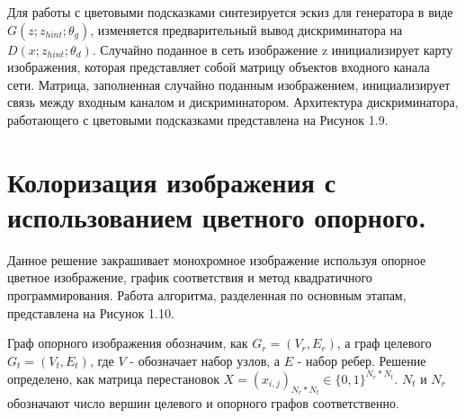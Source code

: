 Для работы с цветовыми подсказками синтезируется эскиз для генератора в виде $G(z; z_{hint}; \theta_g)$, изменяется предварительный вывод дискриминатора на  $D(x; z_{hint}; \theta_d)$. Случайно поданное в сеть изображение z инициализирует карту изображения, которая представляет собой матрицу объектов входного канала сети. Матрица, заполненная случайно поданным изображением, инициализирует связь между входным каналом и дискриминатором.
Архитектура дискриминатора, работающего с цветовыми подсказками представлена на Рисунок 1.9.


\begin{figure}[ht!]
\end{figure}


\newpage
\section {Колоризация изображения с использованием цветного опорного.}
Данное решение закрашивает монохромное изображение используя опорное цветное изображение, график соответствия и метод квадратичного программирования. 
Работа алгоритма, разделенная по основным этапам, представлена на Рисунок 1.10.

\begin{figure}[ht!]
\end{figure}




Граф опорного изображения обозначим, как $G_r = (V_r , E_r)$, а граф целевого $G_t = (V_t , E_t)$, где $V$ - обозначает набор узлов, а $E$ - набор ребер. Решение определено, как матрица перестановок $X = (x_{i,j})_{N_r * N_t} \in {\{0,1\}}^{N_r*N_t}$. $N_t$ и $N_r$ обозначают число вершин целевого и опорного графов соответственно.


